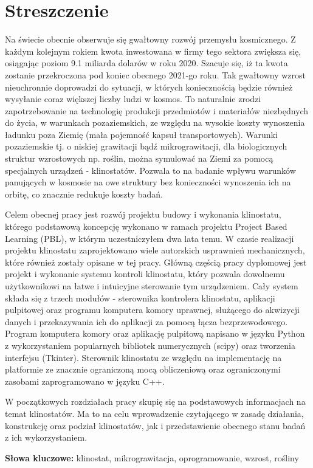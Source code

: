 \chapter*{Streszczenie}

Na świecie obecnie obserwuje się gwałtowny rozwój przemysłu kosmicznego. Z każdym kolejnym rokiem kwota inwestowana w firmy tego sektora zwiększa się, osiągając poziom 9.1 miliarda dolarów w roku 2020. Szacuje się, iż ta kwota zostanie przekroczona pod koniec obecnego 2021-go roku. Tak gwałtowny wzrost nieuchronnie doprowadzi do sytuacji, w których koniecznością będzie również wysyłanie coraz większej liczby ludzi w kosmos. To naturalnie zrodzi zapotrzebowanie na technologię produkcji przedmiotów i materiałów niezbędnych do życia, w warunkach pozaziemskich, ze względu na wysokie koszty wynoszenia ładunku poza Ziemię (mała pojemność kapsuł transportowych). Warunki pozaziemskie tj. o niskiej grawitacji bądź mikrograwitacji, dla biologicznych struktur wzrostowych np. roślin, można symulować na Ziemi za pomocą specjalnych urządzeń - klinostatów. Pozwala to na badanie wpływu warunków panujących w kosmosie na owe struktury bez konieczności wynoszenia ich na orbitę, co znacznie redukuje koszty badań.  

Celem obecnej pracy jest rozwój projektu budowy i wykonania klinostatu, którego podstawową koncepcję wykonano w ramach projektu Project Based Learning (PBL), w którym uczestniczyłem dwa lata temu. W czasie realizacji projektu klinostatu zaprojektowano wiele autorskich usprawnień mechanicznych, które również zostały opisane w tej pracy. Główną częścią pracy dyplomowej jest projekt i wykonanie systemu kontroli klinostatu, który pozwala dowolnemu użytkownikowi na łatwe i intuicyjne sterowanie tym urządzeniem. Cały system składa się z trzech modułów - sterownika kontrolera klinostatu, aplikacji pulpitowej oraz programu komputera komory uprawnej, służącego do akwizycji danych i przekazywania ich do aplikacji za pomocą łącza bezprzewodowego. Program komputera komory oraz aplikację pulpitową napisano w języku Python z wykorzystaniem popularnych bibliotek numerycznych (scipy) oraz tworzenia interfejsu (Tkinter). Sterownik klinostatu ze względu na implementację na platformie ze znacznie ograniczoną mocą obliczeniową oraz ograniczonymi zasobami zaprogramowano w języku C++. 

W początkowych rozdziałach pracy skupię się na podstawowych informacjach na temat klinostatów. Ma to na celu wprowadzenie czytającego w zasadę działania, konstrukcję oraz podział klinostatów, jak i przedstawienie obecnego stanu badań z ich wykorzystaniem. 

{\bf Słowa kluczowe:} klinostat, mikrograwitacja, oprogramowanie, wzrost, rośliny

